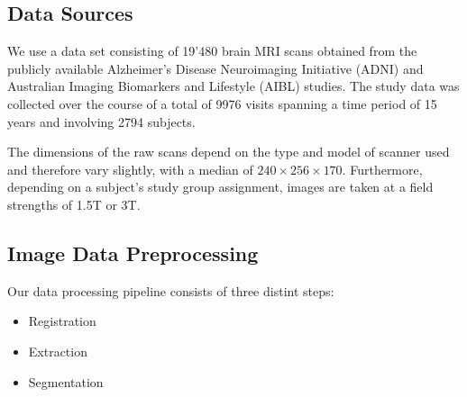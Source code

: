 \subsection{Data Sources}
We use a data set consisting of 19'480 brain MRI scans obtained from the publicly available Alzheimer's Disease Neuroimaging Initiative (ADNI) \cite{jack2008alzheimer} and Australian Imaging Biomarkers and Lifestyle (AIBL) \cite{ellis2009australian} studies. The study data was collected over the course of a total of 9976 visits spanning a time period of 15 years and involving 2794 subjects.

The dimensions of the raw scans depend on the type and model of scanner used and therefore vary slightly, with a median of $ 240 \times 256 \times 170 $. Furthermore, depending on a subject's study group assignment, images are taken at a field strengths of 1.5T or 3T.

\subsection{Image Data Preprocessing}
\label{sec:datpreproc}
Our data processing pipeline consists of three distint steps:

\begin{itemize}
\item Registration
\item Extraction
\item Segmentation
\end{itemize}

